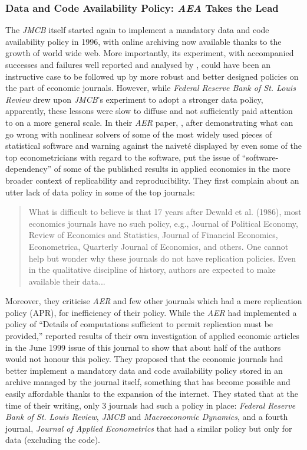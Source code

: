 \documentclass[11pt]{article}
\begin{document}
\subsubsection{Data and Code Availability Policy: \textit{AEA} Takes the Lead}
The \textit{JMCB} itself started again to implement a mandatory data and code availability policy in 1996, with online archiving now available thanks to the growth of world wide web. More importantly, its experiment, with accompanied successes and failures well reported and analysed by \cite{dewald1986replication}, could have been an instructive case to be followed up by more robust and better designed policies on the part of economic journals. However, while \textit{Federal Reserve Bank of St. Louis Review} drew upon \textit{JMCB}'s experiment to adopt a stronger data policy, apparently, these lessons were slow to diffuse and not sufficiently paid attention to on a more general scale. In their \textit{AER} paper, \cite{mccullough2003verifying}, after demonstrating what can go wrong with nonlinear solvers of some of the most widely used pieces of statistical software and warning against the naiveté displayed by even some of the top econometricians with regard to the software, put the issue of ``software-dependency'' of some of the published results in applied economics in the more broader context of replicability and reproducibility. They first complain about an utter lack of data policy in some of the top journals:
\begin{quotation}
 What is difficult to believe is that 17 years
after Dewald et al. (1986), most economics
journals have no such policy, e.g., Journal of
Political Economy, Review of Economics and
Statistics, Journal of Financial Economics,
Econometrica, Quarterly Journal of Economics, and others. One cannot help but wonder
why these journals do not have replication policies. Even in the qualitative discipline of history, authors are expected to make available
their data...
\end{quotation}

Moreover, they criticise \textit{AER} and few other journals which had a mere replication policy (APR), for inefficiency of their policy. While the \textit{AER} had implemented a policy of ``Details of computations sufficient to permit
replication must be provided,'' \cite{mccullough2003verifying} reported results of their own investigation of applied economic articles in the June 1999 issue of this journal to show that about half of the authors would not honour this policy. They proposed that the economic journals had better implement a mandatory data and code availability policy stored in an archive managed by the journal itself, something that has become possible and easily affordable thanks to the expansion of the internet. They stated that at the time of their writing, only 3 journals had such a policy in place: \textit{Federal Reserve Bank of St. Louis Review}, \textit{JMCB} and \textit{Macroeconomic Dynamics}, and a fourth journal, \textit{Journal of Applied Econometrics} that had a similar policy but only for data (excluding the code).\\
\end{document}
